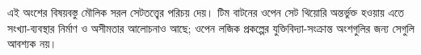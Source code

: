 \documentclass[../../include/open-logic-part]{subfiles}
\begin{document}

\begin{editorial}
এই অংশের বিষয়বস্তু মৌলিক সরল সেটতত্ত্বের পরিচয় দেয়।
টিম বাটনের ওপেন সেট থিয়োরি অন্তর্ভুক্ত হওয়ায় এতে সংখ্যা-ব্যবস্থার
নির্মাণ ও অসীমতার আলোচনাও আছে; ওপেন লজিক প্রকল্পের
যুক্তিবিদ্যা-সংক্রান্ত অংশগুলির জন্য সেগুলি আবশ্যক নয়।
\end{editorial}







\OLEndPartHook
\end{document}
